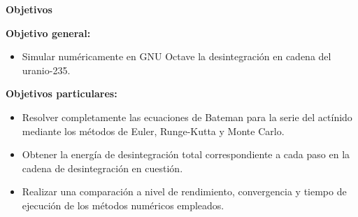 \begin{center}
    \textbf{Objetivos}
\end{center}\vspace{-0.5cm}

\textbf{Objetivo general:}
\begin{itemize}
    \item Simular numéricamente en GNU Octave la desintegración en cadena
 del uranio-235.
\end{itemize}

\textbf{Objetivos particulares:}
\begin{itemize}
    \item Resolver completamente las ecuaciones de Bateman para la serie
 del actínido mediante los métodos de Euler, Runge-Kutta y Monte Carlo.
    \item Obtener la energía de desintegración total correspondiente a cada
 paso en la cadena de desintegración en cuestión. 
    \item Realizar una comparación a nivel de rendimiento, convergencia y tiempo de ejecución de los métodos numéricos empleados.
\end{itemize}